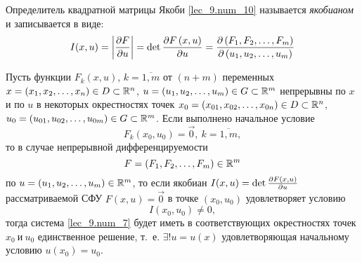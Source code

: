 \documentclass[../../main.tex]{subfiles}
\begin{document}
Определитель квадратной матрицы Якоби 
\eqref{lec_9.num_10} называется \emph{якобианом}
и записывается в виде:
\begin{equation}
    \label{lec_9.num_11}   
    I(x, u) = \left|\frac{\partial F}{\partial u}\right| = 
    \det\frac{\partial F\left(x,u\right)}{\partial u} =
    \frac{\partial \left(F_1,F_2,\dots,F_m\right)}{\partial \left(u_1, u_2,\dots, u_m\right)}
\end{equation}

\begin{thm}
Пусть функции $F_k\left(x, u\right)$, $k = \overline{1, m}$
от $(n+ m)$ переменных 
$x = \left(x_1, x_2, \dots, x_n\right) \in D \subset \mathbb{R}^n$,
$u = \left(u_1, u_2, \dots, u_m\right) \in G \subset \mathbb{R}^m$
непрерывны по $x$ и по $u$ в некоторых окрестностях точек
$x_0 = \left(x_{01}, x_{02}, \dots, x_{0n}\right) \in D 
\subset \mathbb{R}^n$,
$u_0 = \left(u_{01}, u_{02}, \dots, u_{0m}\right) \in G
\subset \mathbb{R}^m$. Если выполнено начальное условие
\begin{equation}
    \label{lec_9.num_12}
    F_k(x_0, u_0) = \vec{0},\ k = \overline{1, m},
\end{equation}
то в случае непрерывной дифференцируемости
\begin{equation}
    \label{lec_9.num_13}
    F = \left(F_1, F_2, \dots, F_m\right) \in \mathbb{R}^m
\end{equation}
по $u = \left(u_1, u_2, \dots, u_m\right) \in \mathbb{R}^m$,
то если якобиан
$I(x, u) = \det\frac{\partial F\left(x, u\right)}{\partial u}$
рассматриваемой СФУ $F\left(x, u\right) = \vec{0}$
в точке $\left(x_0, u_0\right)$ удовлетворяет условию
\begin{equation}
    \label{lec_9.num_14}
    I(x_0, u_0) \neq 0,
\end{equation}
тогда система \eqref{lec_9.num_7} будет иметь в 
соответствующих окрестностях точек $x_0\ \text{и}\ u_0$
единственное решение, т.~е. $\exists!u = u(x)$ удовлетворяющая начальному
 условию $u(x_0) = u_0$.
\end{thm}
\end{document}
